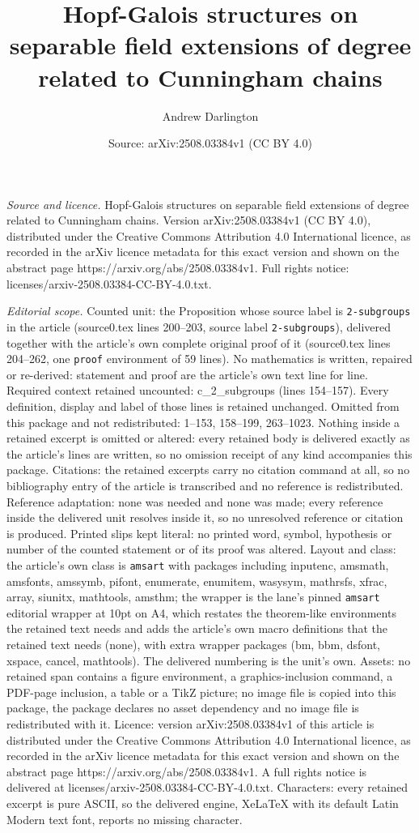 \documentclass[10pt,a4paper]{amsart}
\title[Hopf-Galois structures on separable field extensions of degr]{Hopf-Galois structures on separable field extensions of degree related to Cunningham chains}
\author{Andrew Darlington}
\date{Source: arXiv:2508.03384v1 (CC BY 4.0)}
\begin{document}
\maketitle

\noindent\emph{Source and licence.} Hopf-Galois structures on separable field extensions of degree related to Cunningham chains. Version arXiv:2508.03384v1 (CC BY 4.0), distributed under the Creative Commons Attribution 4.0 International licence, as recorded in the arXiv licence metadata for this exact version and shown on the abstract page https://arxiv.org/abs/2508.03384v1. Full rights notice: licenses/arxiv-2508.03384-CC-BY-4.0.txt.\par\smallskip

\noindent\textit{Editorial scope.} Counted unit: the Proposition whose source label is \texttt{2-subgroups} in the article (source0.tex lines 200--203, source label \texttt{2-subgroups}), delivered together with the article's own complete original proof of it (source0.tex lines 204--262, one \texttt{proof} environment of 59 lines). No mathematics is written, repaired or re-derived: statement and proof are the article's own text line for line. Required context retained uncounted: c\_2\_subgroups (lines 154--157). Every definition, display and label of those lines is retained unchanged. Omitted from this package and not redistributed: 1--153, 158--199, 263--1023. Nothing inside a retained excerpt is omitted or altered: every retained body is delivered exactly as the article's lines are written, so no omission receipt of any kind accompanies this package. Citations: the retained excerpts carry no citation command at all, so no bibliography entry of the article is transcribed and no reference is redistributed. Reference adaptation: none was needed and none was made; every reference inside the delivered unit resolves inside it, so no unresolved reference or citation is produced. Printed slips kept literal: no printed word, symbol, hypothesis or number of the counted statement or of its proof was altered. Layout and class: the article's own class is \texttt{amsart} with packages including inputenc, amsmath, amsfonts, amssymb, pifont, enumerate, enumitem, wasysym, mathrsfs, xfrac, array, siunitx, mathtools, amsthm; the wrapper is the lane's pinned \texttt{amsart} editorial wrapper at 10pt on A4, which restates the theorem-like environments the retained text needs and adds the article's own macro definitions that the retained text needs (none), with extra wrapper packages (bm, bbm, dsfont, xspace, cancel, mathtools). The delivered numbering is the unit's own. Assets: no retained span contains a figure environment, a graphics-inclusion command, a PDF-page inclusion, a table or a TikZ picture; no image file is copied into this package, the package declares no asset dependency and no image file is redistributed with it. Licence: version arXiv:2508.03384v1 of this article is distributed under the Creative Commons Attribution 4.0 International licence, as recorded in the arXiv licence metadata for this exact version and shown on the abstract page https://arxiv.org/abs/2508.03384v1. A full rights notice is delivered at licenses/arxiv-2508.03384-CC-BY-4.0.txt. Characters: every retained excerpt is pure ASCII, so the delivered engine, XeLaTeX with its default Latin Modern text font, reports no missing character.
\end{document}
